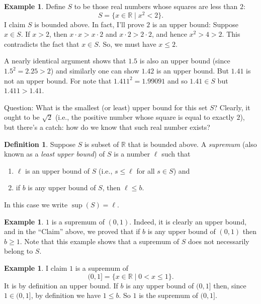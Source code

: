 \documentclass[12pt]{amsart}
\newcommand{\R}{{\mathbb{R}}}
\numberwithin{equation}{section}
\theoremstyle{plain} %
\theoremstyle{definition}
\newtheorem{defn}[equation]{Definition}
\newtheorem{ex}[equation]{Example}
\theoremstyle{remark}
\begin{document}
\begin{ex}
Define $S$ to be those real numbers whose squares are less than $2$:
$$
S = \{x \in \R \mid x^2 < 2\}.
$$
I claim $S$ is bounded above. In fact, I'll prove $2$ is an upper
bound: Suppose $x \in S$. If $x > 2$, then $x \cdot x > x \cdot 2$ and $x \cdot 2 > 2 \cdot 2$, and hence $x^2 > 4 > 2$. This contradicts the fact that $x \in
S$. So, we must have $x \leq 2$.

A nearly identical argument shows that $1.5$ is also an upper bound (since $1.5^2 = 2.25 > 2$) and similarly one can show $1.42$ is an upper bound.  
But $1.41$ is not an upper bound.  For note that $1.411^2 = 1.99091$ and so $1.41 \in S$ but $1.411 > 1.41$. 

Question: What is the smallest (or least) upper bound for this set $S$? Clearly, it ought to be $\sqrt{2}$ (i.e., the positive number whose square is equal
to exactly $2$), but there's a catch: how do we know that such real number exists?
\end{ex}


\begin{defn} Suppose $S$ is subset of $\R$ that is bounded above. A {\em supremum} (also known as a {\em least upper bound}) of $S$ is a number $\ell$ such that
\begin{enumerate}
\item $\ell$ is an upper bound of $S$ (i.e., $s \leq \ell$ for all $s \in S$) and
\item if $b$ is any upper bound of $S$, then $\ell \leq b$. 
\end{enumerate}
In this case we write $\sup(S)=\ell$.\index{$\sup$}
\end{defn}




\begin{ex} $1$ is a supremum of $(0,1)$. Indeed, it is clearly an upper bound, and 
in the ``Claim'' above, we proved that if $b$ is any upper bound of $(0,1)$ then $b \geq 1$. Note that this example shows that a supremum of $S$ does not necessarily 
belong to $S$.
\end{ex}

\begin{ex} I claim $1$ is  a supremum of \[(0,1] = \{x \in \R \mid 0 <
  x \leq 1\}.\] It is by definition an upper bound. If $b$ is any upper bound of $(0, 1]$ then, since $1 \in (0, 
  1]$, by definition
  we have $1 \leq b$. So $1$ is the supremum of $(0,1]$. 
\end{ex}
\end{document}
